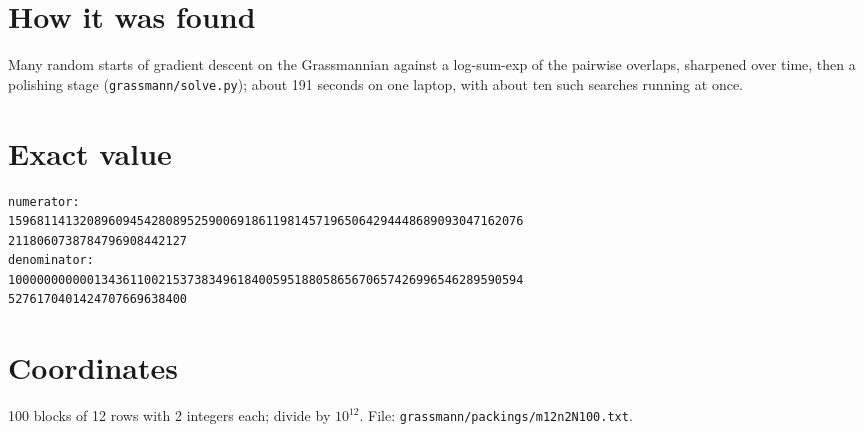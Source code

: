 \documentclass[11pt,a4paper]{article}
\begin{document}
\section{How it was found}
Many random starts of gradient descent on the Grassmannian against a log-sum-exp of the pairwise overlaps, sharpened over time, then a polishing stage (\texttt{grassmann/solve.py}); about 191 seconds on one laptop, with about ten such searches running at once.


\appendix
\section{Exact value}
{\small
\begin{verbatim}
numerator:
159681141320896094542808952590069186119814571965064294448689093047162076
2118060738784796908442127
denominator:
100000000000134361100215373834961840059518805865670657426996546289590594
5276170401424707669638400
\end{verbatim}}

\section{Coordinates}
100 blocks of 12 rows with 2 integers each; divide by $10^{12}$. File: \texttt{grassmann/packings/m12n2N100.txt}.
{\tiny
\begin{multicols}{4}
\end{multicols}}
\end{document}
